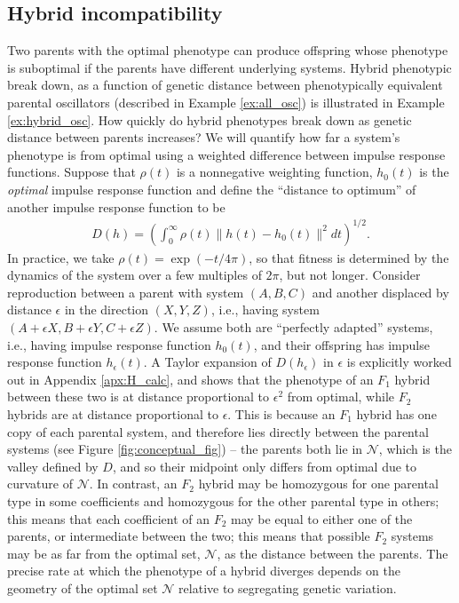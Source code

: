 \documentclass{article}
\newcommand{\1}{\mathbbm{1}}
\newcommand{\allS}{\mathcal{N}}
\begin{document}
\subsection*{Hybrid incompatibility}
Two parents with the optimal phenotype can produce offspring whose phenotype is suboptimal
if the parents have different underlying systems.
Hybrid phenotypic break down, as a function of genetic distance between
phenotypically equivalent parental oscillators (described in Example \ref{ex:all_osc})
is illustrated in Example \ref{ex:hybrid_osc}.
How quickly do hybrid phenotypes break down as genetic distance between parents increases?
We will quantify how far a system's phenotype is from optimal
using a weighted difference between impulse response functions.
Suppose that $\rho(t)$ is a nonnegative weighting function, 
$h_0(t)$ is the \emph{optimal} impulse response function
and define the ``distance to optimum'' of another impulse response function
to be
\begin{align}
\label{eqn:distance}
	D(h) = \left( \int_0^\infty \rho(t) \|h(t) - h_0(t)\|^2 dt \right)^{1/2} .
\end{align}
In practice, we take $\rho(t) = \exp(-t/4\pi)$,
so that fitness is determined by the dynamics of the system over a few multiples of $2 \pi$,
but not longer. 
Consider reproduction between a parent with system $(A, B, C)$ 
and another displaced by distance $\epsilon$ in the direction $(X,Y,Z)$,
i.e., having  system $(A + \epsilon X, B + \epsilon Y, C + \epsilon Z)$.
We assume both are ``perfectly adapted'' systems, 
i.e., having impulse response function $h_0(t)$,
and their offspring has impulse response function $h_\epsilon(t)$.
A Taylor expansion of $D(h_\epsilon)$ in $\epsilon$ 
is explicitly worked out in Appendix \ref{apx:H_calc}, and 
shows that the phenotype of an $F_1$ hybrid between these two is at distance proportional to $\epsilon^2$ from optimal,
while $F_2$ hybrids are at distance proportional to $\epsilon$.
This is because an $F_1$ hybrid has one copy of each parental system,
and therefore lies directly between the parental systems (see Figure \ref{fig:conceptual_fig}) --
the parents both lie in $\allS$, which is the valley defined by $D$,
and so their midpoint only differs from optimal due to curvature of $\allS$.
In contrast, an $F_2$ hybrid may be homozygous for one parental type in some coefficients
and homozygous for the other parental type in others;
this means that each coefficient of an $F_2$ may be equal to either one of the parents,
or intermediate between the two;
this means that possible $F_2$ systems may be as far from the optimal set, $\allS$,
as the distance between the parents.
The precise rate at which the phenotype of a hybrid diverges depends on the geometry
of the optimal set $\allS$ relative to segregating genetic variation.
\end{document}

